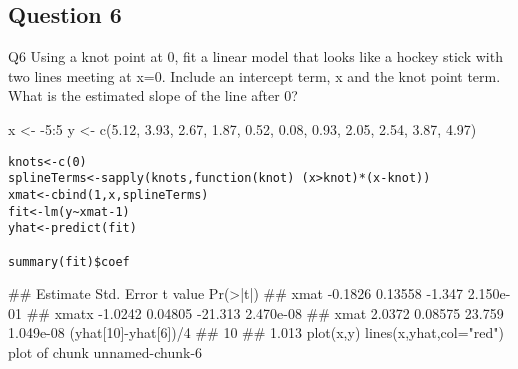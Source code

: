 \documentclass[french]{article}
\begin{document}
	\subsection*{Question 6}
	

Q6
Using a knot point at 0, 
fit a linear model that looks like a hockey stick with two lines meeting at x=0. 
Include an intercept term, x and the knot point term. 
What is the estimated slope of the line after 0?

x <- -5:5
y <- c(5.12, 3.93, 2.67, 1.87, 0.52, 0.08, 0.93, 2.05, 2.54, 3.87, 4.97)

	\begin{framed}
		\begin{verbatim}
knots<-c(0)
splineTerms<-sapply(knots,function(knot) (x>knot)*(x-knot))
xmat<-cbind(1,x,splineTerms)
fit<-lm(y~xmat-1)
yhat<-predict(fit)

summary(fit)$coef
	\end{verbatim}
	\end{framed}
##       Estimate Std. Error t value  Pr(>|t|)
## xmat   -0.1826    0.13558  -1.347 2.150e-01
## xmatx  -1.0242    0.04805 -21.313 2.470e-08
## xmat    2.0372    0.08575  23.759 1.049e-08
(yhat[10]-yhat[6])/4
##    10 
## 1.013
plot(x,y)
lines(x,yhat,col="red")
plot of chunk unnamed-chunk-6
\end{document}
